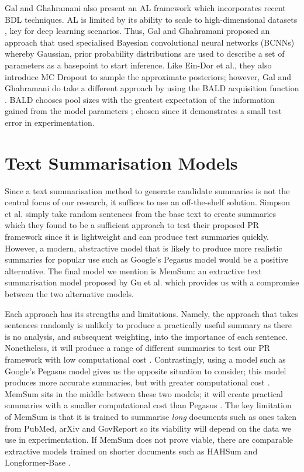 \documentclass[ %
                    author={James Stephenson},
                supervisor={Dr. Edwin Simpson},
                    degree={MSc},
                     title={PROJECT PLAN},
                  subtitle={ Bayesian Deep Learning For Extractive Test Summarisation},
                      type={},
                      year={2022}]{../additions/dissertation}
\begin{document}
		\medbreak
		Gal and Ghahramani \cite{Gal17} also present an AL framework which incorporates recent BDL techniques. AL is limited by its ability to scale to high-dimensional datasets \cite{Tong01}, key for deep learning scenarios. Thus, Gal and Ghahramani proposed an approach that used specialised Bayesian convolutional neural networks (BCNNs) whereby Gaussian, prior probability distributions are used to describe a set of parameters as a basepoint to start inference. Like Ein-Dor et al., they also introduce MC Dropout to sample the approximate posteriors; however, Gal and Ghahramani do take a different approach by using the BALD acquisition function \cite{Houlsby11}. BALD chooses pool sizes with the greatest expectation of the information gained from the model parameters \cite{Gal17}; chosen since it demonstrates a small test error in experimentation.

		\section{Text Summarisation Models}
		\label{chap:literaturereview:summodels}
		
		Since a text summarisation method to generate candidate summaries is not the central focus of our research, it suffices to use an off-the-shelf solution. Simpson et al. \cite{Simpson19} simply take random sentences from the base text to create summaries which they found to be a sufficient approach to test their proposed PR framework since it is lightweight and can produce test summaries quickly. However, a modern, abstractive model that is likely to produce more realistic summaries for popular use such as Google’s Pegasus model \cite{Zhao19} would be a positive alternative. The final model we mention is MemSum: an extractive text summarisation model proposed by Gu et al. \cite{Gu22} which provides us with a compromise between the two alternative models.
		
		\medbreak
		Each approach has its strengths and limitations. Namely, the approach that takes sentences randomly is unlikely to produce a practically useful summary as there is no analysis, and subsequent weighting, into the importance of each sentence. Nonetheless, it will produce a range of different summaries to test our PR framework with low computational cost \cite{Simpson19}. Contrastingly, using a model such as Google's Pegasus model gives us the opposite situation to consider; this model produces more accurate summaries, but with greater computational cost \cite{Zhao19}. MemSum sits in the middle between these two models; it will create practical summaries with a smaller computational cost than Pegasus \cite{Gu22}. The key limitation of MemSum is that it is trained to summarise \emph{long} documents such as ones taken from PubMed, arXiv and GovReport so its viability will depend on the data we use in experimentation. If MemSum does not prove viable, there are comparable extractive models trained on shorter documents such as HAHSum \cite{Jia20} and Longformer-Base \cite{Roush20}.
		
\end{document}
